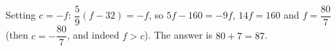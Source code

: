 Setting $c=-f$: $\dfrac59(f-32)=-f$, so $5f-160=-9f$, $14f=160$ and $f=\dfrac{80}{7}$ (then $c=-\dfrac{80}{7}$, and indeed $f>c$). The answer is $80+7=\boxed{87}$.
